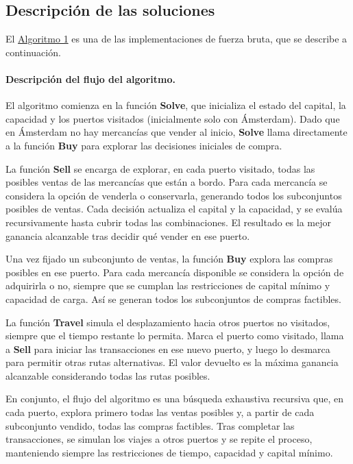 \documentclass[12pt, a4paper]{article}
\begin{document}
\subsection{Descripción de las soluciones}

El \hyperref[alg:jat]{Algoritmo 1} es una de las implementaciones de fuerza bruta, que se describe a continuación.

\paragraph{Descripción del flujo del algoritmo.}
El algoritmo comienza en la función \textbf{Solve}, que inicializa el estado del capital, la capacidad y los puertos visitados (inicialmente solo con Ámsterdam). Dado que en Ámsterdam no hay mercancías que vender al inicio, \textbf{Solve} llama directamente a la función \textbf{Buy} para explorar las decisiones iniciales de compra. 

La función \textbf{Sell} se encarga de explorar, en cada puerto visitado, todas las posibles ventas de las mercancías que están a bordo. Para cada mercancía se considera la opción de venderla o conservarla, generando todos los subconjuntos posibles de ventas. Cada decisión actualiza el capital y la capacidad, y se evalúa recursivamente hasta cubrir todas las combinaciones. El resultado es la mejor ganancia alcanzable tras decidir qué vender en ese puerto.

Una vez fijado un subconjunto de ventas, la función \textbf{Buy} explora las compras posibles en ese puerto. Para cada mercancía disponible se considera la opción de adquirirla o no, siempre que se cumplan las restricciones de capital mínimo y capacidad de carga. Así se generan todos los subconjuntos de compras factibles.

La función \textbf{Travel} simula el desplazamiento hacia otros puertos no visitados, siempre que el tiempo restante lo permita. Marca el puerto como visitado, llama a \textbf{Sell} para iniciar las transacciones en ese nuevo puerto, y luego lo desmarca para permitir otras rutas alternativas. El valor devuelto es la máxima ganancia alcanzable considerando todas las rutas posibles.

En conjunto, el flujo del algoritmo es una búsqueda exhaustiva recursiva que, en cada puerto, explora primero todas las ventas posibles y, a partir de cada subconjunto vendido, todas las compras factibles. Tras completar las transacciones, se simulan los viajes a otros puertos y se repite el proceso, manteniendo siempre las restricciones de tiempo, capacidad y capital mínimo.
\end{document}
